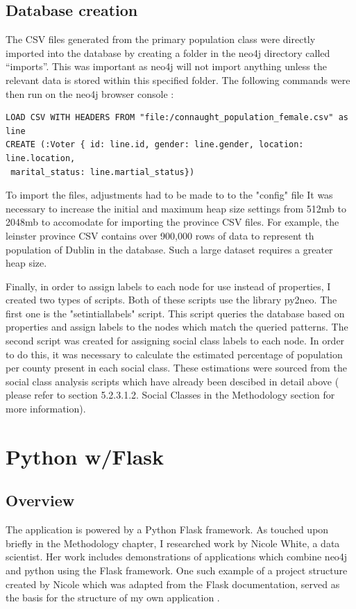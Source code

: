 \subsection{Database creation}
The CSV files generated from the primary population class were directly imported into the database by creating a folder in the neo4j directory called “imports”. This was important as neo4j will not import anything unless the relevant data is stored within this specified folder.  The following commands were then run on the neo4j browser console \cite{loadcsv}:
\begin{verbatim}
LOAD CSV WITH HEADERS FROM "file:/connaught_population_female.csv" as line
CREATE (:Voter { id: line.id, gender: line.gender, location: line.location,
 marital_status: line.martial_status})
\end{verbatim}
To import the files, adjustments had to be made to to the "config" file \cite{heapsize} It was necessary to increase the initial and maximum heap size settings from 512mb to 2048mb to accomodate for importing the province CSV files.  For example, the leinster province CSV contains over 900,000 rows of data to represent th population of Dublin in the database. Such a large dataset requires a greater heap size.

Finally, in order to assign labels to each node for use instead of properties, I created two types of scripts.  Both of these scripts use the library py2neo. The first one is the "set\textunderscore intial\textunderscore labels" script. This script queries the database based on properties and assign labels to the nodes which match the queried patterns. The second script was created for assigning social class labels to each node. 
In order to do this, it was necessary to calculate the estimated percentage of population per county present in each social class. These estimations were sourced from the social class analysis scripts which have already been descibed in detail above ( please refer to section 5.2.3.1.2. Social Classes in the Methodology section for more information).
\pagebreak

\section{Python w/Flask}
\subsection{Overview}
The application is powered by a Python Flask framework. As touched upon briefly in the Methodology chapter, I researched work by Nicole White, a data scientist. Her work includes demonstrations of applications which combine neo4j and python using the Flask framework. One such example of a project structure created by Nicole which was adapted from the Flask documentation, served as the basis for the structure of my own application \cite{nicolewhite}.

